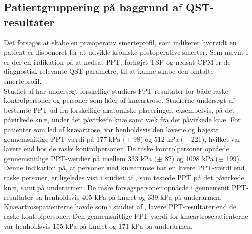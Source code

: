 \subsection{Patientgruppering på baggrund af QST-resultater}
Det forsøges at skabe en præoperativ smerteprofil, som indikerer hvorvidt en patient er disponeret for at udvikle kroniske postoperative smerter. Som nævnt i  er der en indikation på at nedsat PPT, forhøjet TSP og nedsat CPM er de diagnostisk relevante QST-parametre, til at kunne skabe den omtalte smerteprofil. \\
Studiet af  har undersøgt forskellige studiers PPT-resultater for både raske kontrolpersoner og personer som lider af knæartrose. Studierne undersøgt af  bestemte PPT ud fra forskellige anatomiske placeringer, eksempelvis, på det påvirkede knæ, under det påvirkede knæ samt væk fra det påvirkede knæ. For patienter som led af knæartrose, var henholdsvis den laveste og højeste gennemsnitlige PPT-værdi på 177 kPa ($\pm$ 98) og 512 kPa ($\pm$ 221), hvilket var lavere end hos de raske kontrolpersoner. De raske kontrolpersoner opnåede gennemsnitlige PPT-værdier på imellem 333 kPa ($\pm$ 82) og 1098 kPa ($\pm$ 199). \citep{Suokas2012} Denne indikation på, at personer med knæartrose har en lavere PPT-værdi end raske personer, er ligeledes vist i studiet af , som testede PPT på det påvirkede knæ, samt på underarmen. De raske forsøgspersoner opnåede i gennemsnit PPT-resultater på henholdsvis 405 kPa på knæet og 339 kPa på underarmen. Knæartrosepatienterne havde som i studiet af , lavere PPT-resultater end de raske kontrolpersoner. Den gennemsnitlige PPT-værdi for knæartrosepatienterne var henholdsvis 155 kPa på knæet og 171 kPa på underarmen. \citep{Wylde2013} 

\begin{table}[H]
	\centering
	\caption{I tabellen ses resultaterne vedrørende PPT-målinger på henholdsvis raske person og knæartrsoe patienter.  }
	\label{tab:PPT_rask_syg}
\end{table}\vspace{-.25cm}

